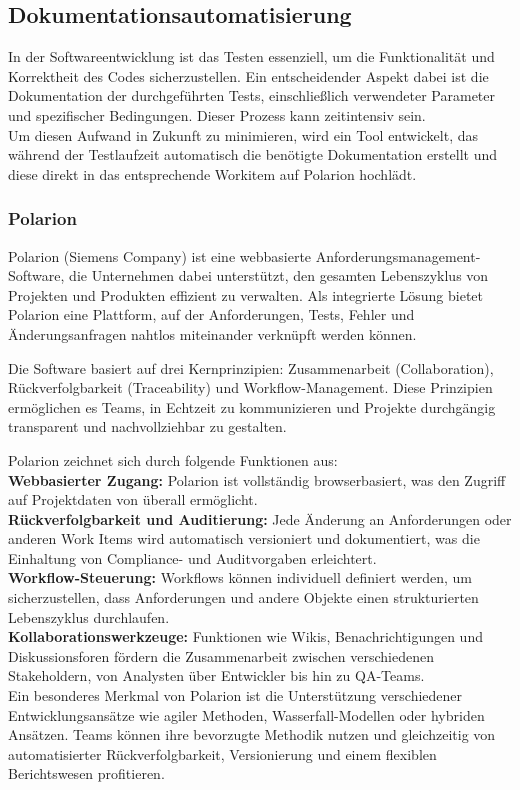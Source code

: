 \documentclass[a4paper, 12pt]{article}
\begin{document}
\subsection{Dokumentationsautomatisierung}\label{Dokumentationsautomatisierung}
In der Softwareentwicklung ist das Testen essenziell, um die Funktionalität und Korrektheit des Codes sicherzustellen. Ein entscheidender Aspekt dabei ist die Dokumentation der durchgeführten Tests, einschließlich verwendeter Parameter und spezifischer Bedingungen. Dieser Prozess kann zeitintensiv sein. \\
Um diesen Aufwand in Zukunft zu minimieren, wird ein Tool entwickelt, das während der Testlaufzeit automatisch die benötigte Dokumentation erstellt und diese direkt in das entsprechende Workitem auf Polarion hochlädt.

\subsubsection{Polarion}\label{polarion}
Polarion (Siemens Company) ist eine webbasierte Anforderungsmanagement-Software, die Unternehmen dabei unterstützt, den gesamten Lebenszyklus von Projekten und Produkten effizient zu verwalten. Als integrierte Lösung bietet Polarion eine Plattform, auf der Anforderungen, Tests, Fehler und Änderungsanfragen nahtlos miteinander verknüpft werden können.

Die Software basiert auf drei Kernprinzipien: Zusammenarbeit (Collaboration), Rückverfolgbarkeit (Traceability) und Workflow-Management. Diese Prinzipien ermöglichen es Teams, in Echtzeit zu kommunizieren und Projekte durchgängig transparent und nachvollziehbar zu gestalten.

Polarion zeichnet sich durch folgende Funktionen aus:\\
\textbf{Webbasierter Zugang:} Polarion ist vollständig browserbasiert, was den Zugriff auf Projektdaten von überall ermöglicht.\\
\textbf{Rückverfolgbarkeit und Auditierung:} Jede Änderung an Anforderungen oder anderen Work Items wird automatisch versioniert und dokumentiert, was die Einhaltung von Compliance- und Auditvorgaben erleichtert.\\
\textbf{Workflow-Steuerung:} Workflows können individuell definiert werden, um sicherzustellen, dass Anforderungen und andere Objekte einen strukturierten Lebenszyklus durchlaufen.\\
\textbf{Kollaborationswerkzeuge:} Funktionen wie Wikis, Benachrichtigungen und Diskussionsforen fördern die Zusammenarbeit zwischen verschiedenen Stakeholdern, von Analysten über Entwickler bis hin zu QA-Teams.\\
Ein besonderes Merkmal von Polarion ist die Unterstützung verschiedener Entwicklungsansätze wie agiler Methoden, Wasserfall-Modellen oder hybriden Ansätzen. Teams können ihre bevorzugte Methodik nutzen und gleichzeitig von automatisierter Rückverfolgbarkeit, Versionierung und einem flexiblen Berichtswesen profitieren.
\end{document}
